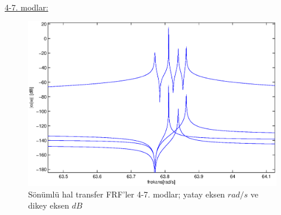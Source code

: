 \documentclass[a4paper]{report}
\begin{document}
\clearpage~\\
\underline{4-7. modlar:}\\
\begin{figure}[H]\shorthandoff{=}
\centerline{
{\includegraphics[width=1.3\textwidth]{./transferFRFs3-6.eps}}}
\caption[Sönümsüz hal nokta FRF'ler]{Sönümlü hal transfer FRF'ler  4-7. modlar; yatay eksen ${rad}/{s}$ ve dikey eksen $dB$ }
\label{fig:noktaFRFs4-7}
\end{figure}

\clearpage
\end{document}
